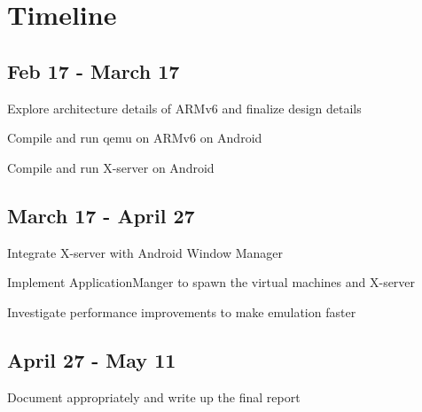 \section{Timeline}
\subsection{Feb 17 - March 17}
	\begin{itemize*}
	\item Explore architecture details of ARMv6 and finalize design details
	\item Compile and run qemu on ARMv6 on Android 
	\item Compile and run X-server on Android
	\end{itemize*}
\subsection{March 17 - April 27}
	\begin{itemize*}
	\item Integrate X-server with Android Window Manager
	\item Implement ApplicationManger to spawn the virtual machines and X-server 
	\item Investigate performance improvements to make emulation faster
	\end{itemize*}
\subsection{April 27 - May 11}
	\begin{itemize*}
	\item Document appropriately and write up the final report 
	\end{itemize*}
